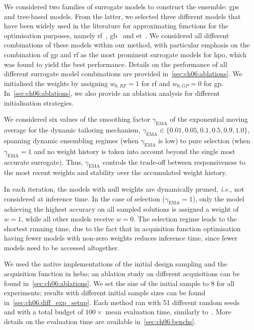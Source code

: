 We considered two families of surrogate models to construct the ensemble: \glspl{gp} and tree-based models.
From the latter, we selected three different models that have been widely used in the literature for approximating functions for the optimisation purposes, namely
\gls{rf}~\citep{Breiman01}, \gls{gb}~\citep{Friedman01} and \gls{et}~\citep{GeuEtAl06}.
We considered all different combinations of these models within our method, with particular emphasis on the combination of \gls{gp} and \gls{rf} as the most prominent surrogate models for \gls{hpo}, which was found to yield the best performance.
Details on the performance of all different surrogate model combinations are provided in~\cref{sec:ch06:ablations}.
We initialised the weights by assigning  $w_{0,RF}=1$ for \gls{rf} and $w_{0,GP}=0$ for \gls{gp}.
In~\cref{sec:ch06:ablations}, we also provide an ablation analysis for different initialisation strategies.

We considered six values of the smoothing factor $\gamma_{\mathrm{EMA}}$ of the exponential moving average for the dynamic tailoring mechanism,  $\gamma_{\mathrm{EMA}}\in\{0.01,0.05,0.1,0.5,0.9,1.0\}$,
spanning dynamic ensembling regimes (when $\gamma_{\mathrm{EMA}}$ is low) to pure selection (when $\gamma_{\mathrm{EMA}}=1$ and no weight history is taken into account beyond the single most accurate surrogate).
Thus, $\gamma_{\mathrm{EMA}}$ controls the trade-off between responsiveness to the most recent weights and stability over the accumulated weight history.

In each iteration, the models with null weights are dynamically pruned, \emph{i.e.}, not considered at inference time. In the case of selection ($\gamma_{\mathrm{EMA}}=1$), only the model achieving the highest accuracy on all sampled solutions is assigned a weight of $w=1$, while all other models receive $w=0$.
The selection regime leads to the shortest running time, due to the fact that in acquisition function optimisation having fewer models with non-zero weights reduces inference time, since fewer models need to be accessed altogether.

We used the native implementations of the initial design sampling and the acquisition function in \gls{hebo}; an ablation study on different acquisitions can be found in~\cref{sec:ch06:ablations}.
We set the size of the initial sample to 8 for all experiments; results with different initial sample sizes can be found in~\cref{sec:ch06:diff_exp_setup}.
Each method ran with 51 different random seeds and with a total budget of $100 \times$ mean evaluation time, similarly to~\citet{EggEtAl21}.
More details on the evaluation time are available in~\cref{sec:ch06:benchs}.

